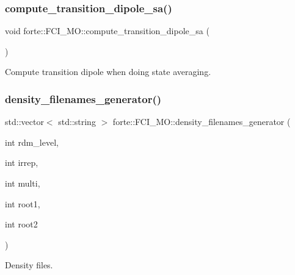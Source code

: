 \subsubsection{\texorpdfstring{compute\+\_\+transition\+\_\+dipole\+\_\+sa()}{compute\_transition\_dipole\_sa()}}
{\footnotesize\ttfamily void forte\+::\+F\+C\+I\+\_\+\+M\+O\+::compute\+\_\+transition\+\_\+dipole\+\_\+sa (\begin{DoxyParamCaption}{ }\end{DoxyParamCaption})\hspace{0.3cm}{\ttfamily [protected]}}



Compute transition dipole when doing state averaging. 

\mbox{\label{classforte_1_1_f_c_i___m_o_a7b41431a81c3d736da3c917c53d2665f}} 
\subsubsection{\texorpdfstring{density\+\_\+filenames\+\_\+generator()}{density\_filenames\_generator()}}
{\footnotesize\ttfamily std\+::vector$<$ std\+::string $>$ forte\+::\+F\+C\+I\+\_\+\+M\+O\+::density\+\_\+filenames\+\_\+generator (\begin{DoxyParamCaption}\item[{int}]{rdm\+\_\+level,  }\item[{int}]{irrep,  }\item[{int}]{multi,  }\item[{int}]{root1,  }\item[{int}]{root2 }\end{DoxyParamCaption})}



Density files. 

\mbox{\label{classforte_1_1_f_c_i___m_o_a3028e42a3b4e87f299d73591b1b6454e}} 

